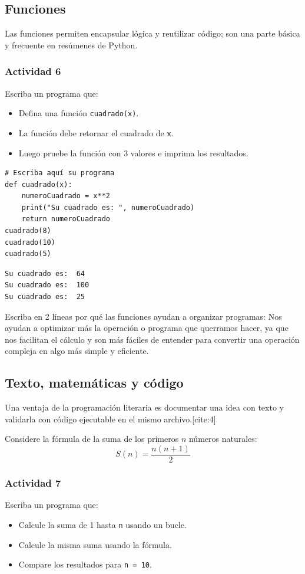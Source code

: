 \documentclass{article}
\begin{document}
\subsection{Funciones}
\label{sec:org5a551e5}
Las funciones permiten encapsular lógica y reutilizar código; son una parte básica y frecuente en resúmenes de Python.

\subsubsection{Actividad 6}
\label{sec:orgd28bcae}
Escriba un programa que:
\begin{itemize}
\item Defina una función \texttt{cuadrado(x)}.
\item La función debe retornar el cuadrado de \texttt{x}.
\item Luego pruebe la función con 3 valores e imprima los resultados.
\end{itemize}

\begin{verbatim}
# Escriba aquí su programa
def cuadrado(x):
    numeroCuadrado = x**2
    print("Su cuadrado es: ", numeroCuadrado)
    return numeroCuadrado
cuadrado(8)
cuadrado(10)
cuadrado(5)
\end{verbatim}

\begin{verbatim}
Su cuadrado es:  64
Su cuadrado es:  100
Su cuadrado es:  25
\end{verbatim}


Escriba en 2 líneas por qué las funciones ayudan a organizar programas:
Nos ayudan a optimizar más la operación o programa que querramos hacer, ya que nos facilitan
el cálculo y son más fáciles de entender para convertir una operación compleja en algo más simple y eficiente.
\subsection{Texto, matemáticas y código}
\label{sec:org987e71e}
Una ventaja de la programación literaria es documentar una idea con texto y validarla con código ejecutable en el mismo archivo.[cite:4]

Considere la fórmula de la suma de los primeros \(n\) números naturales:
\[
S(n) = \frac{n(n+1)}{2}
\]

\subsubsection{Actividad 7}
\label{sec:org32058ce}
Escriba un programa que:
\begin{itemize}
\item Calcule la suma de 1 hasta \texttt{n} usando un bucle.
\item Calcule la misma suma usando la fórmula.
\item Compare los resultados para \texttt{n = 10}.
\end{itemize}
\end{document}
